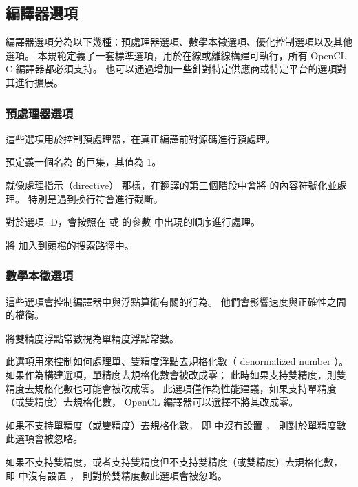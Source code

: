 \subsection{編譯器選項}

編譯器選項分為以下幾種：預處理器選項、數學本徵選項、優化控制選項以及其他選項。
本規範定義了一套標準選項，用於在線或離線構建可執行，所有 OpenCL C 編譯器都必須支持。
也可以通過增加一些針對特定供應商或特定平台的選項對其進行擴展。

\subsubsection{預處理器選項}
這些選項用於控制預處理器，在真正編譯前對源碼進行預處理。

預定義一個名為  的巨集，其值為 1。
\stopclOption

就像處理指示（directive）  那樣，在翻譯的第三個階段中會將  的內容符號化並處理。
特別是遇到換行符會進行截斷。
\stopclOption

對於選項 -D，會按照在  或  的參數  中出現的順序進行處理。

將  加入到頭檔的搜索路徑中。
\stopclOption

\subsubsection[sec:MathIntrinsicsOption]{數學本徵選項}
這些選項會控制編譯器中與浮點算術有關的行為。
他們會影響速度與正確性之間的權衡。

將雙精度浮點常數視為單精度浮點常數。
\stopclOption

此選項用來控制如何處理單、雙精度浮點去規格化數（ denormalized number ）。
如果作為構建選項，單精度去規格化數會被改成零；
此時如果支持雙精度，則雙精度去規格化數也可能會被改成零。
此選項僅作為性能建議，如果支持單精度（或雙精度）去規格化數，
 OpenCL 編譯器可以選擇不將其改成零。

如果不支持單精度（或雙精度）去規格化數，
即  中沒有設置 ，
則對於單精度數此選項會被忽略。

如果不支持雙精度，或者支持雙精度但不支持雙精度（或雙精度）去規格化數，
即  中沒有設置 ，
則對於雙精度數此選項會被忽略。

